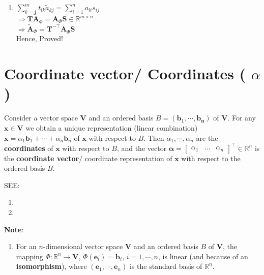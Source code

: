 \begin{enumerate}
    \item \( \displaystyle
        \sum_{k=1}^{m} t_{lk}\tilde{a}_{kj} = \sum_{i=1}^{n} a_{li}s_{ij} 
    \)\\
    \(
        \Rightarrow \mathbf{T\tilde{A}}_\Phi = \mathbf{A}_\Phi \mathbf{S} \in \mathbb{R}^{m\times n}
    \)\\
    \(
        \Rightarrow \mathbf{\tilde{A}}_\Phi = \mathbf{T^{-\top}A}_\Phi \mathbf{S}
    \)\\
    Hence, Proved!
    
\end{enumerate}








\section{Coordinate vector/ Coordinates ( $\alpha$ ) \cite{mfml-1}}\label{Coordinate vector}\label{Coordinates}

Consider a vector space $\mathbf{V}$ and an ordered basis $\mathit{B} = \mathbf{(b_1, \cdots , b_n)}$ of $\mathbf{V}$. For any $\mathbf{x \in V}$ we obtain a unique representation (linear combination) \( \mathbf{x} = \alpha_1\mathbf{b}_1 + \cdots + \alpha_n\mathbf{b}_n \) of $\mathbf{x}$ with respect to $\mathit{B}$. Then $\alpha_1, \cdots , \alpha_n$ are the \textbf{coordinates} of $\mathbf{x}$ with respect to $\mathit{B}$, and the vector \( \displaystyle \bm{\alpha} = \begin{bmatrix} \alpha_1 & \hdots & \alpha_n \end{bmatrix}^\top \in \mathbb{R}^n \) is the \textbf{coordinate vector}/ coordinate representation of $\mathbf{x}$ with respect to the ordered basis $\mathit{B}$.


\noindent SEE:
\begin{enumerate}
    \item {}
    \item {} 
\end{enumerate}

\vspace{0.2cm}
\noindent \textbf{Note}:
\begin{enumerate}
    \item For an $n$-dimensional vector space $\mathbf{V}$ and an ordered basis $\mathit{B}$ of $\mathbf{V}$, the mapping $\Phi : \mathbb{R}^n \to \mathbf{V}$, $\Phi(\mathbf{e}_i) = \mathbf{b}_i$, $i = 1, \cdots , n$, is linear (and because of  an \textbf{isomorphism}), where $(\mathbf{e}_1, \cdots , \mathbf{e}_n)$ is the standard basis of $\mathbb{R}^n$.
\end{enumerate}




